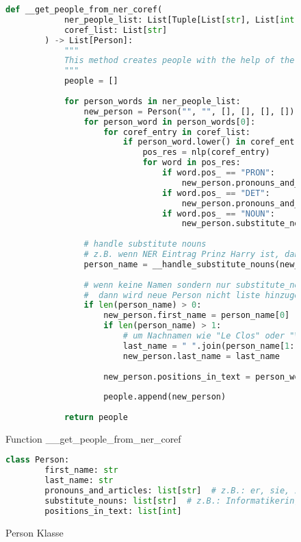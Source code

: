 \begin{figure}[H]
    \begin{lstlisting}[language=Python]
        def __get_people_from_ner_coref(
            ner_people_list: List[Tuple[List[str], List[int]]], 
            coref_list: List[str]
        ) -> List[Person]:
            """
            This method creates people with the help of the NER list and the coref list
            """
            people = []
        
            for person_words in ner_people_list:
                new_person = Person("", "", [], [], [], [])
                for person_word in person_words[0]:
                    for coref_entry in coref_list:
                        if person_word.lower() in coref_entry:
                            pos_res = nlp(coref_entry)
                            for word in pos_res:
                                if word.pos_ == "PRON":
                                    new_person.pronouns_and_articles.append(word.text)
                                if word.pos_ == "DET":
                                    new_person.pronouns_and_articles.append(word.text)
                                if word.pos_ == "NOUN":
                                    new_person.substitute_nouns.append(word.text)
        
                # handle substitute nouns
                # z.B. wenn NER Eintrag Prinz Harry ist, dann wird Prinz zu substitute_nouns Liste der Person hinzugefügt
                person_name = __handle_substitute_nouns(new_person, person_words[0])
        
                # wenn keine Namen sondern nur substitute_nouns gefunden,
                #  dann wird neue Person nicht liste hinzugefügt
                if len(person_name) > 0:
                    new_person.first_name = person_name[0]
                    if len(person_name) > 1:
                        # um Nachnamen wie "Le Clos" oder "Von Niederhaeusern" zu erkennen
                        last_name = " ".join(person_name[1:])
                        new_person.last_name = last_name
        
                    new_person.positions_in_text = person_words[1]
        
                    people.append(new_person)
        
            return people        
    \end{lstlisting}
    \caption{Function \_\_get\_people\_from\_ner\_coref}
    \label{get-people-from-ner-coref}
\end{figure}

\begin{figure}[H]
	\begin{lstlisting}[language=Python]
    class Person:
        first_name: str
        last_name: str
        pronouns_and_articles: list[str]  # z.B.: er, sie, ihr, ihre, sein, seine der, die, das
        substitute_nouns: list[str]  # z.B.: Informatikerin, Studentin, Schwester, Tochter, Prinz, Experte
        positions_in_text: list[int]
	\end{lstlisting}
	\caption{Person Klasse}
	\label{person-class}
\end{figure}